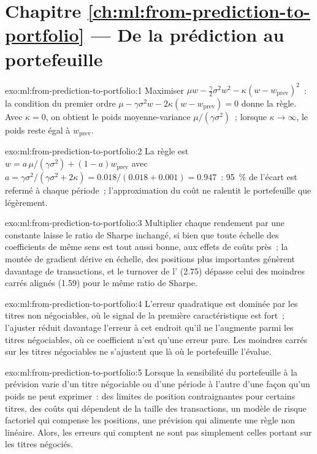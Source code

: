 \section*{Chapitre \ref{ch:ml:from-prediction-to-portfolio} --- De la prédiction au portefeuille}

\begin{solution}{exo:ml:from-prediction-to-portfolio:1}
Maximiser $\mu w - \frac\gamma2\sigma^2w^2 - \kappa(w - w_{\mathrm{prev}})^2$~: la condition du premier ordre $\mu - \gamma\sigma^2w -
2\kappa(w - w_{\mathrm{prev}}) = 0$ donne la règle. Avec $\kappa = 0$, on obtient le poids moyenne-variance $\mu/(\gamma\sigma^2)$~; lorsque
$\kappa\to\infty$, le poids reste égal à $w_{\mathrm{prev}}$.
\end{solution}

\begin{solution}{exo:ml:from-prediction-to-portfolio:2}
La règle est $w = a\,\mu/(\gamma\sigma^2) + (1 - a)w_{\mathrm{prev}}$ avec $a = \gamma\sigma^2/(\gamma\sigma^2 + 2\kappa) =
0.018/(0.018 + 0.001) = 0.947$~: 95~\% de l'écart est refermé à chaque période~; l'approximation du coût ne ralentit le portefeuille que légèrement.
\end{solution}

\begin{solution}{exo:ml:from-prediction-to-portfolio:3}
Multiplier chaque rendement par une constante laisse le ratio de Sharpe inchangé, si bien que toute échelle des coefficients de même
sens est tout aussi bonne, aux effets de coûts près~; la montée de gradient dérive en échelle, des positions plus importantes génèrent davantage de transactions, et le
turnover de l' (2.75) dépasse celui des moindres carrés alignés (1.59) pour le même ratio de Sharpe.
\end{solution}

\begin{solution}{exo:ml:from-prediction-to-portfolio:4}
L'erreur quadratique est dominée par les titres non négociables, où le signal de la première caractéristique est fort~; l'ajuster réduit
davantage l'erreur à cet endroit qu'il ne l'augmente parmi les titres négociables, où ce coefficient n'est qu'une erreur pure. Les moindres carrés sur les
titres négociables ne s'ajustent que là où le portefeuille l'évalue.
\end{solution}

\begin{solution}{exo:ml:from-prediction-to-portfolio:5}
Lorsque la sensibilité du portefeuille à la prévision varie d'un titre négociable ou d'une période à l'autre d'une façon qu'un poids ne peut exprimer~:
des limites de position contraignantes pour certains titres, des coûts qui dépendent de la taille des transactions, un modèle de risque factoriel qui compense les positions, une
prévision qui alimente une règle non linéaire. Alors, les erreurs qui comptent ne sont pas simplement celles portant sur les titres négociés.
\end{solution}

